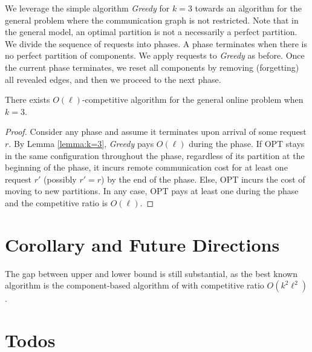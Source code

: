 \documentclass[manuscript,screen=true]{acmart}
\newcommand{\todo}[1]{\noindent\color{brown}{todo: #1}\color{black}}
\begin{document}
We leverage the simple algorithm \emph{Greedy} for $k=3$
towards an algorithm for the general problem
where the communication graph is not restricted.
Note that in the general model,
an optimal partition is not a necessarily a perfect partition.
We divide the sequence of requests into phases.
A phase terminates when there is no perfect partition of components.
We apply requests to \emph{Greedy} as before. 
Once the current phase terminates,
we reset all components by removing (forgetting) all revealed edges,
and then we proceed to the next phase.

\begin{theorem} \label{cor:k=3}
	There exists $O(\ell)$-competitive algorithm for the general online problem when $k=3$. 
\end{theorem}
\begin{proof}
	Consider any phase and assume it terminates upon arrival of some request $r$.
	By Lemma  \ref{lemma:k=3},
	\emph{Greedy} pays $O(\ell)$ during the phase.
	If OPT stays in the same configuration throughout the phase,
	regardless of its partition at the beginning of the phase,        
	it incurs remote communication cost for at least one request $r'$ (possibly $r'=r$) by the end of the phase.
	Else,
	OPT incurs the cost of moving to new partitions.
	In any case,
	OPT pays at least one during the phase and 
	the competitive ratio is $O(\ell)$.
\end{proof}


\section{Corollary and Future Directions}

The gap between upper and lower bound is still substantial, as the best known algorithm is the component-based algorithm of   \cite{repartition-disc} with competitive ratio $O(k^2\ell^2)$.


\section{Todos}

\todo{Make ORCID visible in ACM style}

\todo{Include e-mails}

\todo{Check ACM package whitelist}

\todo{Replace package algorithmpseudocode, it is not whitelisted https://www.acm.org/publications/taps/whitelist-of-latex-packages}

\todo{Make an ACM account for the submission}
\end{document}
